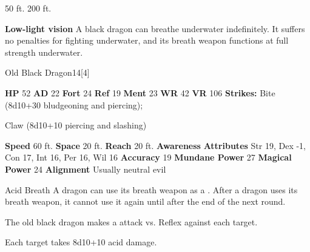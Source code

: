       
       50 ft.
     200 ft.
    \par\noindent\textbf{Low-light vision}
        A black dragon can breathe underwater indefinitely.
        It suffers no penalties for fighting underwater, and its breath weapon functions at full strength underwater.
  

  \begin{monsubsection}{Old Black Dragon}{14}[4]
    \vspace{-1em}\vspace{-1em}
    \vspace{0em}

    
    

    \begin{spellcontent}
      \begin{spelltargetinginfo}
        \pari \textbf{HP} 52 \monsep
          \textbf{AD} 22 \monsep
          \textbf{Fort} 24 \monsep
          \textbf{Ref} 19 \monsep
          \textbf{Ment} 23
        \pari \textbf{WR} 42 \monsep
        \textbf{VR} 106
        \pari \textbf{Strikes:}
            Bite  (8d10+30 bludgeoning and piercing);
\par Claw  (8d10+10 piercing and slashing)
      \end{spelltargetinginfo}
    \end{spellcontent}
    \begin{monsterfooter}
      \pari \textbf{Speed} 60 ft. \monsep
        \textbf{Space} 20 ft. \monsep
        \textbf{Reach} 20 ft.
      \pari \textbf{Awareness} 
      \pari \textbf{Attributes}
        Str 19, Dex -1,
        Con 17, Int 16,
        Per 16, Wil 16
      \pari \textbf{Accuracy} 19 \monsep
        \textbf{Mundane Power} 27 \monsep
      \textbf{Magical Power} 24
      \pari \textbf{Alignment} Usually neutral evil
    \end{monsterfooter}
  \end{monsubsection}
  \begin{freeability}{Acid Breath}
      A dragon can use its breath weapon as a .
      After a dragon uses its breath weapon, it cannot use it again until after the end of the next round.
      \par The old black dragon makes a  attack
        vs. Reflex against each target.
    
    \hit Each target takes 8d10+10 acid damage.
    \end{freeability}
  

